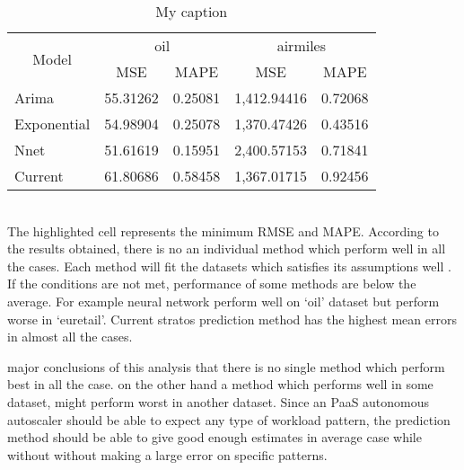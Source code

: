 \begin{table}[]
\centering
\caption{My caption}
\label{my-label}
\begin{tabular}{|l|r|r|r|r|}
\hline
\multicolumn{1}{|c|}{\multirow{2}{*}{Model}} & \multicolumn{2}{c|}{oil}                             & \multicolumn{2}{c|}{airmiles}                        \\ \cline{2-5} 
\multicolumn{1}{|c|}{}                       & \multicolumn{1}{c|}{MSE} & \multicolumn{1}{c|}{MAPE} & \multicolumn{1}{c|}{MSE} & \multicolumn{1}{c|}{MAPE} \\ \hline
Arima                                        & 55.31262                 & 0.25081                   & 1,412.94416              & 0.72068                   \\ \hline
Exponential                                  & 54.98904                 & 0.25078                   & 1,370.47426              & 0.43516                   \\ \hline
Nnet                                         & 51.61619                 & 0.15951                   & 2,400.57153              & 0.71841                   \\ \hline
Current                                      & 61.80686                 & 0.58458                   & 1,367.01715              & 0.92456                   \\ \hline
\end{tabular}
\end{table}

\\The highlighted cell represents the minimum RMSE and MAPE. According to the results obtained, there is no an individual method which perform well in all the cases. Each method will fit the datasets which satisfies its assumptions well . If the conditions are not met, performance of some methods are below the average. For example neural network perform well on ‘oil’ dataset but perform worse in ‘euretail’.  Current stratos prediction method has the highest mean errors in almost all the cases.

major conclusions of this analysis that there is no single method which perform best in all the case. on the other hand a method which performs well in some dataset, might perform worst in another dataset.
Since an PaaS autonomous autoscaler should be able to expect any type of workload pattern, the prediction method should be able to give good enough estimates in average case while without without making a large error on specific patterns.

